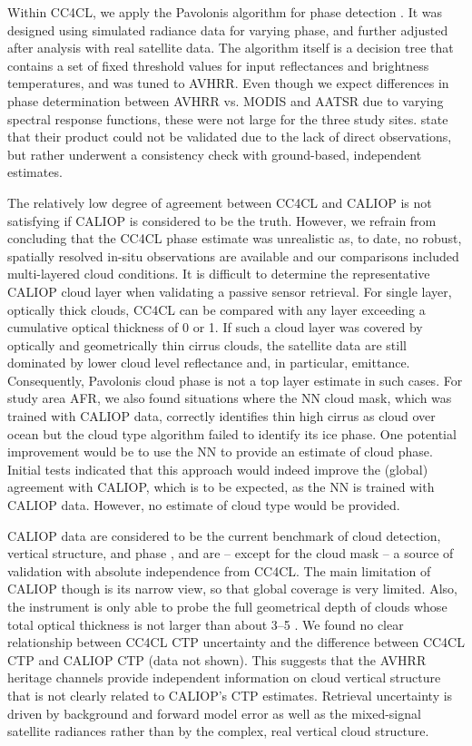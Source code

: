 Within CC4CL, we apply the Pavolonis algorithm for phase detection \citep{Pavolonis05}. It was designed using simulated radiance data for varying phase, and further adjusted after analysis with real satellite data. The algorithm itself is a decision tree that contains a set of fixed threshold values for input reflectances and brightness temperatures, and was tuned to AVHRR. Even though we expect differences in phase determination between AVHRR vs. MODIS and AATSR due to varying spectral response functions, these were not large for the three study sites. \citet{Pavolonis05} state that their product could not be validated due to the lack of direct observations, but rather underwent a consistency check with ground-based, independent estimates. 

The relatively low degree of agreement between CC4CL and CALIOP is not satisfying if CALIOP is considered to be the truth. However, we refrain from concluding that the CC4CL phase estimate was unrealistic as, to date, no robust, spatially resolved in-situ observations are available and our comparisons included multi-layered cloud conditions. It is difficult to determine the representative CALIOP cloud layer when validating a passive sensor retrieval. For single layer, optically thick clouds, CC4CL can be compared with any layer exceeding a cumulative optical thickness of 0 or 1. If such a cloud layer was covered by optically and geometrically thin cirrus clouds, the satellite data are still dominated by lower cloud level reflectance and, in particular, emittance. Consequently, Pavolonis cloud phase is not a top layer estimate in such cases. For study area AFR, we also found situations where the NN cloud mask, which was trained with CALIOP data, correctly identifies thin high cirrus as cloud over ocean but the cloud type algorithm failed to identify its ice phase. One potential improvement would be to use the NN to provide an estimate of cloud phase. Initial tests indicated that this approach would indeed improve the (global) agreement with CALIOP, which is to be expected, as the NN is trained with CALIOP data. However, no estimate of cloud type would be provided.

CALIOP data are considered to be the current benchmark of cloud detection, vertical structure, and phase \citep{Winker09,KarlssonJohansson13,Holz08}, and are -- except for the cloud mask -- a source of validation with absolute independence from CC4CL. The main limitation of CALIOP though is its narrow view, so that global coverage is very limited. Also, the instrument is only able to probe the full geometrical depth of clouds whose total optical thickness is not larger than about 3--5 \citep{KarlssonJohansson13}. We found no clear relationship between CC4CL CTP uncertainty and the difference between CC4CL CTP and CALIOP CTP (data not shown). This suggests that the AVHRR heritage channels provide independent information on cloud vertical structure that is not clearly related to CALIOP's CTP estimates. Retrieval uncertainty is driven by background and forward model error as well as the mixed-signal satellite radiances rather than by the complex, real vertical cloud structure.

